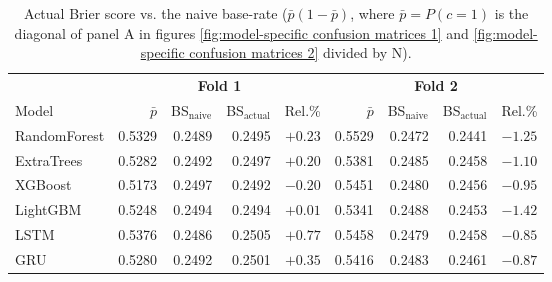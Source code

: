 \documentclass[12pt, a4paper]{article}
\begin{document}
\begin{table}[H]
\centering
\small
\begin{tabular}{l|rrr|r||rrr|r}
\toprule
 & \multicolumn{4}{c||}{\textbf{Fold 1}} & \multicolumn{4}{c}{\textbf{Fold 2}} \\
Model & $\bar p$ & BS$_{\text{naive}}$ & BS$_{\text{actual}}$ & Rel.\% & $\bar p$ & BS$_{\text{naive}}$ & BS$_{\text{actual}}$ & Rel.\% \\
\midrule
RandomForest & 0.5329 & 0.2489 & 0.2495 & $+0.23$ & 0.5529 & 0.2472 & 0.2441 & $-1.25$ \\
ExtraTrees   & 0.5282 & 0.2492 & 0.2497 & $+0.20$ & 0.5381 & 0.2485 & 0.2458 & $-1.10$ \\
XGBoost      & 0.5173 & 0.2497 & 0.2492 & $\mathbf{-0.20}$ & 0.5451 & 0.2480 & 0.2456 & $-0.95$ \\
LightGBM     & 0.5248 & 0.2494 & 0.2494 & $+0.01$ & 0.5341 & 0.2488 & 0.2453 & $\mathbf{-1.42}$ \\
LSTM         & 0.5376 & 0.2486 & 0.2505 & $+0.77$ & 0.5458 & 0.2479 & 0.2458 & $-0.85$ \\
GRU          & 0.5280 & 0.2492 & 0.2501 & $+0.35$ & 0.5416 & 0.2483 & 0.2461 & $-0.87$ \\
\bottomrule
\end{tabular}
\caption{Actual Brier score vs. the naive base-rate ($\bar{p}(1 - \bar{p})$, where $\bar{p} = P(c = 1)$ is the
diagonal of panel A in figures \ref{fig:model-specific confusion matrices 1} and \ref{fig:model-specific confusion matrices 2} divided by N).}
\label{tab:brier_baseline}
\end{table}

\medskip
\end{document}
